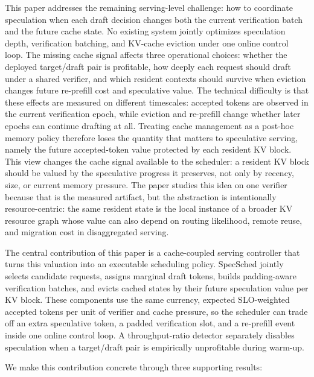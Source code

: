 \documentclass[journal]{IEEEtran}
\newcommand{\system}{SpecSched}
\begin{document}
This paper addresses the remaining serving-level challenge: how to
coordinate speculation when each draft decision changes both the current
verification batch and the future cache state. No existing system
jointly optimizes speculation depth, verification batching, and
KV-cache eviction under one online control loop. The missing cache
signal affects three operational choices: whether the deployed
target/draft pair is profitable, how deeply each request should draft
under a shared verifier, and which resident contexts should survive
when eviction changes future re-prefill cost and speculative value.
The technical difficulty is that these effects are measured on different
timescales: accepted tokens are observed in the current verification
epoch, while eviction and re-prefill change whether later epochs can
continue drafting at all. Treating cache management as a post-hoc memory
policy therefore loses the quantity that matters to speculative serving,
namely the future accepted-token value protected by each resident KV
block.
This view changes the cache signal available to the scheduler: a
resident KV block should be valued by the speculative progress it
preserves, not only by recency, size, or current memory pressure.
The paper studies this idea on one verifier because that is the
measured artifact, but the abstraction is intentionally resource-centric:
the same resident state is the local instance of a broader KV resource
graph whose value can also depend on routing likelihood, remote reuse,
and migration cost in disaggregated serving.

The central contribution of this paper is a cache-coupled serving
controller that turns this valuation into an executable scheduling
policy. \system{} jointly selects candidate requests, assigns marginal
draft tokens, builds padding-aware verification batches, and evicts
cached states by their future speculation value per KV block. These
components use the same currency, expected SLO-weighted accepted tokens
per unit of verifier and cache pressure, so the scheduler can trade off
an extra speculative token, a padded verification slot, and a re-prefill
event inside one online control loop. A throughput-ratio detector
separately disables speculation when a target/draft pair is empirically
unprofitable during warm-up.

We make this contribution concrete through three supporting results:
\end{document}
